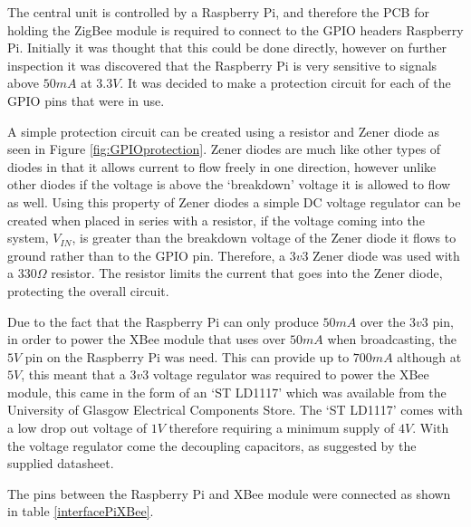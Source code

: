 

The central unit is controlled by a Raspberry Pi, and therefore the PCB for holding the ZigBee module is required to connect to the GPIO headers Raspberry Pi.  Initially it was thought that this could be done directly, however on further inspection it was discovered that the Raspberry Pi is very sensitive to signals above $50\unit{mA}$ at $3.3\unit{V}$. It was decided to make a protection circuit for each of the GPIO pins that were in use. 

A simple protection circuit can be created using a resistor and Zener diode as seen in Figure \ref{fig:GPIOprotection}. Zener diodes are much like other types of diodes in that it allows current to flow freely in one direction, however unlike other diodes if the voltage is above the `breakdown' voltage it is allowed to flow as well. Using this property of Zener diodes a simple DC voltage regulator can be created when placed in series with a resistor, if the voltage coming into the system, $V_{IN}$, is greater than the breakdown voltage of the Zener diode it flows to ground rather than to the GPIO pin. Therefore, a $3v3$ Zener diode was used with a $330\Omega$ resistor. The resistor limits the current that goes into the Zener diode, protecting the overall circuit.

Due to the fact that the Raspberry Pi can only produce $50\unit{mA}$ over the $3v3$ pin, in order to power the XBee module that uses over $50\unit{mA}$ when broadcasting, the $5\unit{V}$ pin on the Raspberry Pi was need. This can provide up to $700\unit{mA}$ although at $5\unit{V}$, this meant that a $3v3$ voltage regulator was required to power the XBee module, this came in the form of an `ST LD1117' which was available from the University of Glasgow Electrical Components Store. The `ST LD1117' comes with a low drop out voltage of $1\unit{V}$ therefore requiring a minimum supply of $4\unit{V}$. With the voltage regulator come the decoupling capacitors, as suggested by the supplied datasheet.

The pins between the Raspberry Pi and XBee module were connected as shown in table \ref{interfacePiXBee}.

